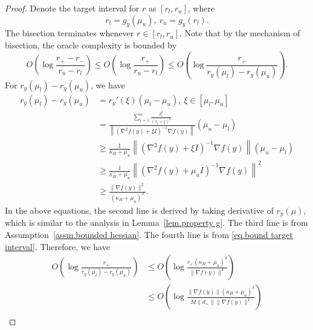 \documentclass{mcom-l}
\numberwithin{equation}{section}
\begin{document}
\begin{proof}
    Denote the target interval for $r$ as $[r_l,r_u]$, where
    \begin{equation*}
        r_l = g_y(\mu_u), \ r_u=g_y(r_l).
    \end{equation*}
    The bisection terminates whenever $r\in[r_l,r_u]$. Note that by the mechanism of bisection, the oracle complexity is bounded by
    \begin{equation*}
        O\left(\log\frac{r_+-r_-}{r_u-r_l}\right)\leq O\left(\log\frac{r_+}{r_u-r_l}\right) \leq O\left(\log\frac{r_+}{r_y(\mu_l)-r_y(\mu_u)}\right).
    \end{equation*}
    For $r_y(\mu_l)-r_y(\mu_u)$, we have
    \begin{equation*}
        \begin{aligned}
            r_y(\mu_l)-r_y(\mu_u) & =r_y'(\xi)(\mu_l-\mu_u), \ \xi\in[\mu_l,\mu_u]                                                                                         \\
                                  & =\frac{\sum_{i=1}^n \frac{\beta_i^2}{(\lambda_i+\xi)^3}}{\left\|\left(\nabla^2 f(y)+\xi I\right)^{-1}\nabla f(y)\right\|}(\mu_u-\mu_l) \\
                                  & \geq \frac{1}{\kappa_H+\mu_u} \left\|\left(\nabla^2 f(y)+\xi I\right)^{-1}\nabla f(y)\right\|(\mu_u-\mu_l)                             \\
                                  & \geq \frac{1}{\kappa_H+\mu_u} \left\|\left(\nabla^2 f(y)+\mu_u I\right)^{-1}\nabla f(y)\right\|^2                                      \\
                                  & \geq \frac{\|\nabla f(y)\|^2}{(\kappa_H+\mu_u)^3}.
        \end{aligned}
    \end{equation*}
    In the above equations, the second line is derived by taking derivative of $r_y(\mu)$, which is similar to the analysis in Lemma~\ref{lem.property g}. The third line is from Assumption~\ref{assm.bounded hessian}. The fourth line is from \eqref{eq.bound target interval}. Therefore, we have
    \begin{equation*}
        \begin{aligned}
            O\left(\log\frac{r_+}{r_y(\mu_l)-r_y(\mu_u)}\right) & \leq O\left(\log\frac{r_+(\kappa_H+\mu_u)^3}{\|\nabla f(y)\|^2}\right)                                                                                \\
                                                                & \leq O\left(\log\frac{\|\nabla f(y)\|(\kappa_H+\mu_u)^3}{M\|d_+\|\|\nabla f(y)\|^2}\right)                                                            \\

\end{aligned}
\end{equation*}
\end{proof}
\end{document}
